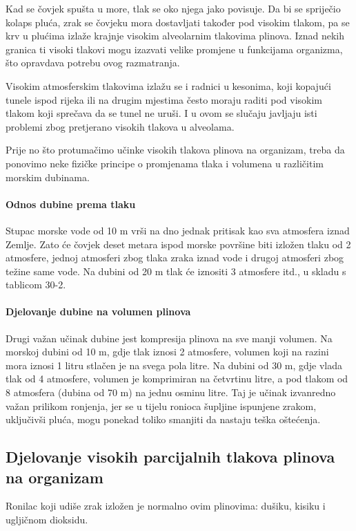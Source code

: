 \documentclass[12pt]{article}
\begin{document}
Kad se čovjek spušta u more, tlak se oko njega jako povisuje. Da bi se spriječio
kolaps pluća, zrak se čovjeku mora dostavljati također pod visokim tlakom, pa se
krv u plućima izlaže krajnje visokim alveolarnim tlakovima plinova. Iznad nekih
granica ti visoki tlakovi mogu izazvati velike promjene u funkcijama organizma,
što opravdava potrebu ovog razmatranja.

Visokim atmosferskim tlakovima izlažu se i radnici u kesonima, koji kopajući
tunele ispod rijeka ili na drugim mjestima često moraju raditi pod visokim
tlakom koji sprečava da se tunel ne uruši. I u ovom se slučaju javljaju isti
problemi zbog pretjerano visokih tlakova u alveolama.

Prije no što protumačimo učinke visokih tlakova plinova na organizam, treba da
ponovimo neke fizičke principe o promjenama tlaka i volumena u različitim
morskim dubinama.

\paragraph{Odnos dubine prema tlaku} Stupac morske vode od 10 m vrši na dno
jednak pritisak kao sva atmosfera iznad Zemlje. Zato će čovjek deset metara
ispod morske površine biti izložen tlaku od 2 atmosfere, jednoj atmosferi zbog
tlaka zraka iznad vode i drugoj atmosferi zbog težine same vode. Na dubini od 20
m tlak će iznositi 3 atmosfere itd., u skladu s tablicom 30-2.

\paragraph{Djelovanje dubine na volumen plinova} Drugi važan učinak dubine jest
kompresija plinova na sve manji volumen. Na morskoj dubini od 10 m, gdje tlak
iznosi 2 atmosfere, volumen koji na razini mora iznosi 1 litru stlačen je na
svega pola litre. Na dubini od 30 m, gdje vlada tlak od 4 atmosfere, volumen je
komprimiran na četvrtinu litre, a pod tlakom od 8 atmosfera (dubina od 70 m) na
jednu osminu litre. Taj je učinak izvanredno važan prilikom ronjenja, jer se u
tijelu ronioca šupljine ispunjene zrakom, uključivši pluća, mogu ponekad toliko
smanjiti da nastaju teška oštećenja.

\subsection{Djelovanje visokih parcijalnih tlakova plinova na organizam}

Ronilac koji udiše zrak izložen je normalno ovim plinovima: dušiku, kisiku i
ugljičnom dioksidu.
\end{document}

